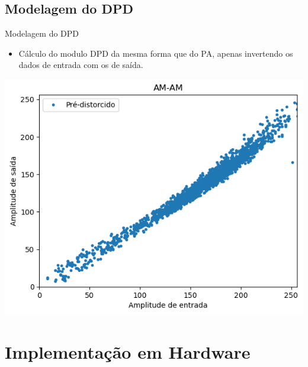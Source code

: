 \documentclass{if-beamer}
\begin{document}
\subsection{Modelagem do DPD}
\begin{frame}{Modelagem do DPD}
	\begin{minipage}{0.5\textwidth}
		\begin{itemize}
			\item Cálculo do modulo DPD da mesma forma que do PA, apenas invertendo os dados de entrada com os de saída.
		\end{itemize}
		
		
	\end{minipage}%
	\hspace{0.04\textwidth}
	\begin{minipage}{0.5\textwidth}
		\includegraphics[scale=0.40]{modelodpd.png}
	\end{minipage}
\end{frame}
\section{Implementação em Hardware}
\end{document}
